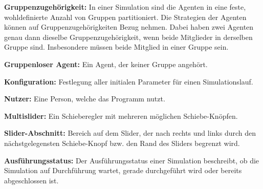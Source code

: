 \documentclass[parskip=full,11pt,twoside]{scrartcl}
\begin{document}
\textbf{Gruppenzugehörigkeit:}
In einer Simulation sind die Agenten in eine feste, wohldefinierte Anzahl von Gruppen partitioniert. Die Strategien der Agenten können auf Gruppenzugehörigkeiten Bezug nehmen. Dabei haben zwei Agenten genau dann dieselbe Gruppenzugehörigkeit, wenn beide Mitglieder in derselben Gruppe sind. Insbesondere müssen beide Mitglied in einer Gruppe sein.

\textbf{Gruppenloser Agent:}
Ein Agent, der keiner Gruppe angehört.

\textbf{Konfiguration:}
Festlegung aller initialen Parameter für einen Simulationslauf.

\textbf{Nutzer:}
Eine Person, welche das Programm nutzt.

\textbf{Multislider:}
Ein Schieberegler mit mehreren möglichen Schiebe-Knöpfen.

\textbf{Slider-Abschnitt:}
Bereich auf dem Slider, der nach rechts und links durch den nächstgelegensten Schiebe-Knopf bzw. den Rand des Sliders begrenzt wird.

\textbf{Ausführungsstatus:}
Der Ausführungsstatus einer Simulation beschreibt, ob die Simulation auf Durchführung wartet, gerade durchgeführt wird oder bereits abgeschlossen ist. 
\end{document}
